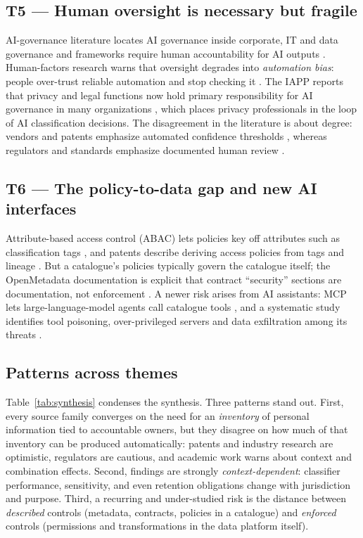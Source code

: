 \documentclass[journal,onecolumn,11pt]{IEEEtran}
\begin{document}
\subsection{T5 --- Human oversight is necessary but fragile}
AI-governance literature locates AI governance inside corporate, IT and data governance \cite{mantymaki} and frameworks require human accountability for AI outputs \cite{nist_airmf,iso42001,osfi_e23}. Human-factors research warns that oversight degrades into \emph{automation bias}: people over-trust reliable automation and stop checking it \cite{parasuraman}. The IAPP reports that privacy and legal functions now hold primary responsibility for AI governance in many organizations \cite{iapp_ai}, which places privacy professionals in the loop of AI classification decisions. The disagreement in the literature is about degree: vendors and patents emphasize automated confidence thresholds \cite{pat_bigid}, whereas regulators and standards emphasize documented human review \cite{osfi_e23,nist_airmf}.

\subsection{T6 --- The policy-to-data gap and new AI interfaces}
Attribute-based access control (ABAC) lets policies key off attributes such as classification tags \cite{nist800162}, and patents describe deriving access policies from tags and lineage \cite{pat_hitachi}. But a catalogue's policies typically govern the catalogue itself; the OpenMetadata documentation is explicit that contract ``security'' sections are documentation, not enforcement \cite{om_contracts}. A newer risk arises from AI assistants: MCP lets large-language-model agents call catalogue tools \cite{om_mcp}, and a systematic study identifies tool poisoning, over-privileged servers and data exfiltration among its threats \cite{hou_mcp}.

\subsection{Patterns across themes}
Table~\ref{tab:synthesis} condenses the synthesis. Three patterns stand out. First, every source family converges on the need for an \emph{inventory} of personal information tied to accountable owners, but they disagree on how much of that inventory can be produced automatically: patents and industry research are optimistic, regulators are cautious, and academic work warns about context and combination effects. Second, findings are strongly \emph{context-dependent}: classifier performance, sensitivity, and even retention obligations change with jurisdiction and purpose. Third, a recurring and under-studied risk is the distance between \emph{described} controls (metadata, contracts, policies in a catalogue) and \emph{enforced} controls (permissions and transformations in the data platform itself).
\end{document}
